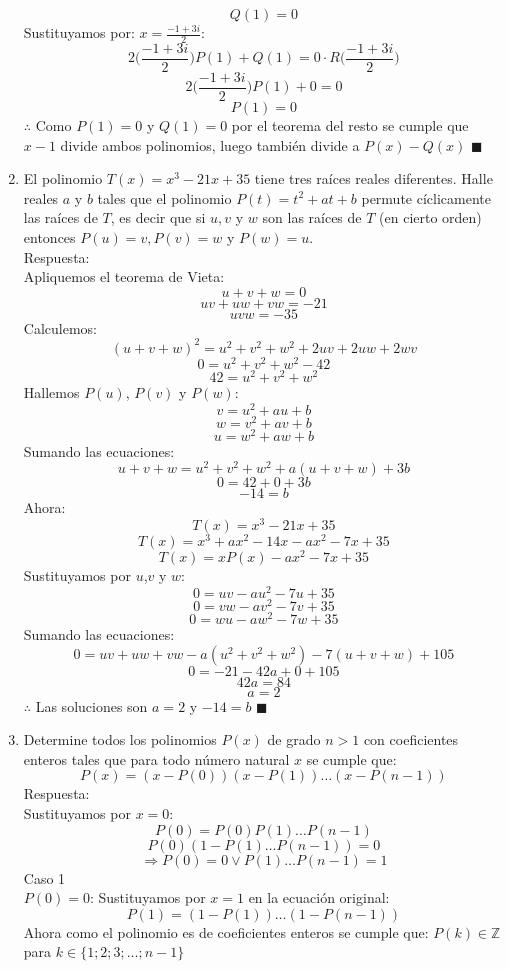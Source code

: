 \documentclass{book}
\newcommand{\Z}{\mathbb{Z}} \def\max{\mathop{\mbox{\rm máx}}} %
\begin{document}
\begin{enumerate}
          $$Q(1)=0$$
          Sustituyamos por:  $\displaystyle{x=\frac{-1+3i}{2}}$:
          $$2\bigg(\frac{-1+3i}{2}\bigg)P(1)+Q(1)=0\cdot R \bigg(\frac{-1+3i}{2}\bigg)$$
          $$ 2\bigg(\frac{-1+3i}{2}\bigg)P(1)+0=0$$
          $$P(1)=0$$
          $\therefore$ Como  $P(1)=0$ y $Q(1)=0$ por el teorema del resto se cumple que $x-1$ divide ambos polinomios, luego también divide a $P(x)-Q(x)$ $\blacksquare$\\
    \item El polinomio $T(x) = x^3 - 21x + 35$ tiene tres raíces reales diferentes. Halle reales $a$ y $b$ tales que el polinomio $P(t) = t^2 + at + b$ permute cíclicamente las raíces de $T$, es decir que si $u,v$ y $w$ son las raíces de $T$ (en cierto orden) entonces $P(u) = v,P(v) = w$ y $P(w) = u$.\\
          Respuesta:\\
          Apliquemos el teorema de Vieta:
          $$u+v+w=0$$
          $$uv+uw+vw=-21$$
          $$uvw=-35$$
          Calculemos:
          $$(u+v+w)^2=u^2+v^2+w^2+2uv+2uw+2wv$$
          $$0=u^2+v^2+w^2-42$$
          $$42=u^2+v^2+w^2$$
          Hallemos $P(u)$, $P(v)$ y $P(w)$:
          $$v=u^2+au+b$$
          $$w=v^2+av+b$$
          $$u=w^2+aw+b$$
          Sumando las ecuaciones:
          $$u+v+w=u^2+v^2+w^2+a(u+v+w)+3b$$
          $$0=42+0+3b$$
          $$-14=b$$
          Ahora:
          $$T(x) = x^3  -21x + 35$$
          $$T(x)= x^3+ax^2-14x-ax^2-7x+35$$
          $$T(x)= xP(x)-ax^2-7x+35$$
          Sustituyamos por $u$,$v$ y $w$:
          $$0=uv-au^2-7u+35$$
          $$0=vw-av^2-7v+35$$
          $$0=wu-aw^2-7w+35$$
          Sumando las ecuaciones:
          $$0=uv+uw+vw-a(u^2+v^2+w^2 )-7(u+v+w)+105$$
          $$0=-21-42a+0+105$$
          $$42a=84$$
          $$a=2$$
          $\therefore$ Las soluciones son $a=2$ y $-14=b$ $\blacksquare$\\
    \item Determine todos los polinomios $P(x)$ de grado $n>1$ con coeficientes enteros tales que para todo número natural $x$ se cumple que:
          $$P(x)=(x-P(0))(x-P(1))\ldots(x-P(n-1))$$
          Respuesta:\\
          Sustituyamos por $x=0$:
          $$P(0)=P(0)P(1)\ldots P(n-1)$$
          $$P(0)(1-P(1)\ldots P(n-1))=0$$
          $$\Rightarrow P(0)=0\vee P(1)\ldots P(n-1)=1$$
          Caso 1 \\$P(0)=0$:
              Sustituyamos por $x=1$ en la ecuación original:
              $$P(1)=(1-P(1))\ldots(1-P(n-1))$$
              Ahora como el polinomio es de coeficientes enteros se cumple que: $P(k)\in\Z$ para $k\in \{1;2;3;\ldots;n-1\}$

\end{enumerate}
\end{document}
